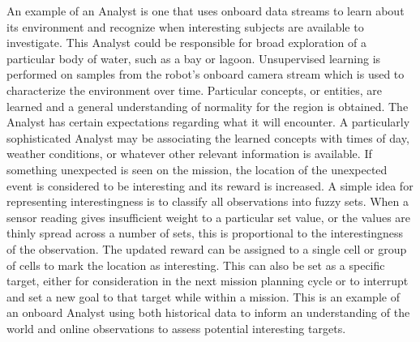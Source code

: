 \documentclass{tamuccthesis}
\begin{document}
An example of an Analyst is one that uses onboard data streams to learn about its environment and recognize when interesting subjects are available to investigate. This Analyst could be responsible for broad exploration of a particular body of water, such as a bay or lagoon. Unsupervised learning is performed on samples from the robot's onboard camera stream which is used to characterize the environment over time. Particular concepts, or entities, are learned and a general understanding of normality for the region is obtained. The Analyst has certain expectations regarding what it will encounter. A particularly sophisticated Analyst may be associating the learned concepts with times of day, weather conditions, or whatever other relevant information is available. If something unexpected is seen on the mission, the location of the unexpected event is considered to be interesting and its reward is increased. A simple idea for representing interestingness is to classify all observations into fuzzy sets. When a sensor reading gives insufficient weight to a particular set value, or the values are thinly spread across a number of sets, this is proportional to the interestingness of the observation. The updated reward can be assigned to a single cell or group of cells to mark the location as interesting. This can also be set as a specific target, either for consideration in the next mission planning cycle or to interrupt and set a new goal to that target while within a mission. This is an example of an onboard Analyst using both historical data to inform an understanding of the world and online observations to assess potential interesting targets. 
\end{document}

